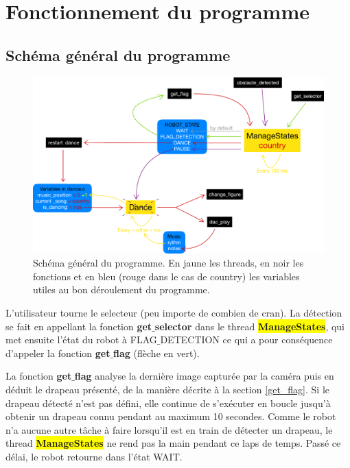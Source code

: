 \documentclass{article}
\newcommand{\state}{\colorbox{yellow}{\textbf{ManageStates}}\xspace}
\begin{document}
    \section{Fonctionnement du programme}
    
    \subsection{Schéma général du programme}
    \begin{figure}[!ht]
        \includegraphics[scale=0.7]{images/code-structure.pdf}
        \caption{Schéma général du programme. En jaune les threads, en noir les fonctions et en bleu (rouge dans le cas de country) les variables utiles au bon déroulement du programme.}
        \label{fig:structure} %
    \end{figure}

    L'utilisateur tourne le selecteur (peu importe de combien de cran). 
    La détection se fait en appellant la fonction \textbf{get$\_$selector} dans le thread \state, qui met ensuite l'état du robot à \textcolor{bleu}{FLAG$\_$DETECTION} ce qui a pour conséquence d'appeler la fonction \textbf{get$\_$flag} (\textcolor{vert}{flèche en vert}). \\ \par
    
    La fonction \textbf{get$\_$flag} analyse la dernière image capturée par la caméra puis en déduit le drapeau présenté, de la manière décrite à la section \ref{get_flag}.
    Si le drapeau détecté n'est pas défini, elle continue de s'exécuter en boucle jusqu'à obtenir un drapeau connu pendant au maximum 10 secondes.
    Comme le robot n'a aucune autre tâche à faire lorsqu'il est en train de détecter un drapeau, le thread \state ne rend pas la main pendant ce laps de temps.
    Passé ce délai, le robot retourne dans l'état \textcolor{bleu}{WAIT}. \\ \par
    
\end{document}
